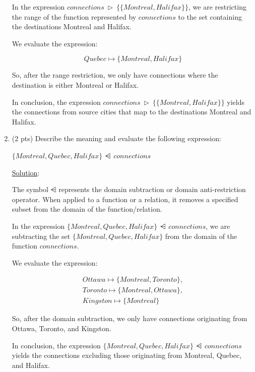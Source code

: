 \documentclass[12pt]{article}
\begin{document}
\begin{spacing}{1.5}
\begin{enumerate}
		      In the expression $connections \: \triangleright \: \{\{Montreal, Halifax\}\}$, we are restricting the range of the function represented by $connections$ to the set containing the destinations Montreal and Halifax.
		      		      
		      We evaluate the expression:
		      		      
		      $$Quebec \mapsto \{Montreal, Halifax\}$$
		      		      
		      So, after the range restriction, we only have connections where the destination is either Montreal or Halifax.
		      		      
		      In conclusion, the expression $connections \: \triangleright \: \{\{Montreal, Halifax\}\}$ yields the connections from source cities that map to the destinations Montreal and Halifax.
		      		          
		\item (2 pts) Describe the meaning and evaluate the following expression:
		      		      
		      $\{Montreal, Quebec, Halifax\} \: \ndres \: connections$
		      
		      \noindent \underline{Solution}:
		              
		      The symbol $\ndres$ represents the domain subtraction or domain anti-restriction operator. When applied to a function or a relation, it removes a specified subset from the domain of the function/relation.
		      		      
		      In the expression $\{Montreal, Quebec, Halifax\} \: \ndres \: connections$, we are subtracting the set  $\{Montreal, Quebec, Halifax\}$ from the domain of the function $connections$.
		      		      
		      We evaluate the expression:
		      		      
		      \begin{align*}
		      	Ottawa \mapsto \{Montreal, Toronto\}, \\
		      	Toronto \mapsto \{Montreal, Ottawa\}, \\
		      	Kingston \mapsto \{Montreal\}         
		      \end{align*}
		      		      
		      So, after the domain subtraction, we only have connections originating from Ottawa, Toronto, and Kingston.
		      		      
		      In conclusion, the expression $\{Montreal, Quebec, Halifax\} \: \ndres \: connections$ yields the connections excluding those originating from Montreal, Quebec, and Halifax.
		      		      

\end{enumerate}
\end{spacing}
\end{document}

